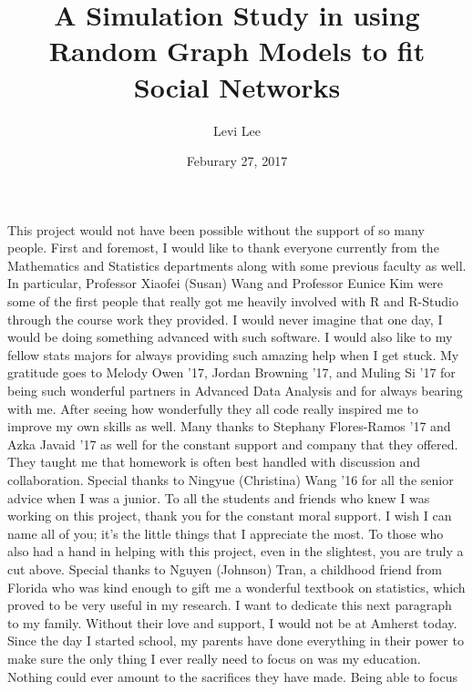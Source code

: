\documentclass[12pt,twoside]{amherstthesis}
\title{A Simulation Study in using Random Graph Models to fit Social Networks}
\author{Levi Lee}
\date{Feburary 27, 2017}
\begin{document}
      \maketitle
  
  \frontmatter %
  \pagestyle{empty} %

      \begin{acknowledgements}
      This project would not have been possible without the support of so many
      people. First and foremost, I would like to thank everyone currently
      from the Mathematics and Statistics departments along with some previous
      faculty as well. In particular, Professor Xiaofei (Susan) Wang and
      Professor Eunice Kim were some of the first people that really got me
      heavily involved with R and R-Studio through the course work they
      provided. I would never imagine that one day, I would be doing something
      advanced with such software. I would also like to my fellow stats majors
      for always providing such amazing help when I get stuck. My gratitude
      goes to Melody Owen '17, Jordan Browning '17, and Muling Si '17 for
      being such wonderful partners in Advanced Data Analysis and for always
      bearing with me. After seeing how wonderfully they all code really
      inspired me to improve my own skills as well. Many thanks to Stephany
      Flores-Ramos '17 and Azka Javaid '17 as well for the constant support
      and company that they offered. They taught me that homework is often
      best handled with discussion and collaboration. Special thanks to
      Ningyue (Christina) Wang '16 for all the senior advice when I was a
      junior. To all the students and friends who knew I was working on this
      project, thank you for the constant moral support. I wish I can name all
      of you; it's the little things that I appreciate the most. To those who
      also had a hand in helping with this project, even in the slightest, you
      are truly a cut above. Special thanks to Nguyen (Johnson) Tran, a
      childhood friend from Florida who was kind enough to gift me a wonderful
      textbook on statistics, which proved to be very useful in my research. I
      want to dedicate this next paragraph to my family. Without their love
      and support, I would not be at Amherst today. Since the day I started
      school, my parents have done everything in their power to make sure the
      only thing I ever really need to focus on was my education. Nothing
      could ever amount to the sacrifices they have made. Being able to focus

\end{acknowledgements}
\end{document}

